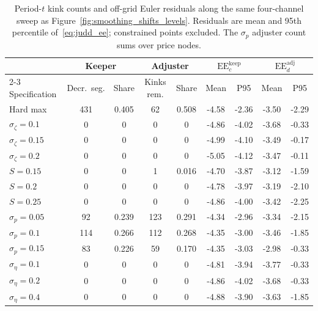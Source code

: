 \begin{table}[htbp]
\centering
\caption{Period-$t$ kink counts and off-grid Euler residuals along the same four-channel sweep as Figure~\ref{fig:smoothing_shifts_levels}. Residuals are mean and 95th percentile of~\eqref{eq:judd_ee}; constrained points excluded. The $\sigma_p$ adjuster count sums over price nodes.}
\label{tab:smoothing_euler_full}
\small
\begin{tabular}{lcccccccc}
\hline
 & \multicolumn{2}{c}{Keeper} & \multicolumn{2}{c}{Adjuster} & \multicolumn{2}{c}{$\mathrm{EE}_c^{\mathrm{keep}}$} & \multicolumn{2}{c}{$\mathrm{EE}_d^{\mathrm{adj}}$} \\
\cline{2-3}\cline{4-5}\cline{6-7}\cline{8-9}
Specification & Decr.\ seg. & Share & Kinks rem. & Share & Mean & P95 & Mean & P95 \\
\hline
Hard max & 431 & 0.405 & 62 & 0.508 & -4.58 & -2.36 & -3.50 & -2.29 \\
$\sigma_{\zeta} = 0.1$ & 0 & 0 & 0 & 0 & -4.86 & -4.02 & -3.68 & -0.33 \\
$\sigma_{\zeta} = 0.15$ & 0 & 0 & 0 & 0 & -4.99 & -4.10 & -3.49 & -0.17 \\
$\sigma_{\zeta} = 0.2$ & 0 & 0 & 0 & 0 & -5.05 & -4.12 & -3.47 & -0.11 \\
$S = 0.15$ & 0 & 0 & 1 & 0.016 & -4.70 & -3.87 & -3.12 & -1.59 \\
$S = 0.2$ & 0 & 0 & 0 & 0 & -4.78 & -3.97 & -3.19 & -2.10 \\
$S = 0.25$ & 0 & 0 & 0 & 0 & -4.86 & -4.00 & -3.42 & -2.25 \\
$\sigma_{p} = 0.05$ & 92 & 0.239 & 123 & 0.291 & -4.34 & -2.96 & -3.34 & -2.15 \\
$\sigma_{p} = 0.1$ & 114 & 0.266 & 112 & 0.268 & -4.35 & -3.00 & -3.46 & -1.85 \\
$\sigma_{p} = 0.15$ & 83 & 0.226 & 59 & 0.170 & -4.35 & -3.03 & -2.98 & -0.33 \\
$\sigma_{\eta} = 0.1$ & 0 & 0 & 0 & 0 & -4.81 & -3.94 & -3.77 & -0.33 \\
$\sigma_{\eta} = 0.2$ & 0 & 0 & 0 & 0 & -4.86 & -4.02 & -3.68 & -0.33 \\
$\sigma_{\eta} = 0.4$ & 0 & 0 & 0 & 0 & -4.88 & -3.90 & -3.63 & -1.85 \\
\hline
\end{tabular}
\end{table}
